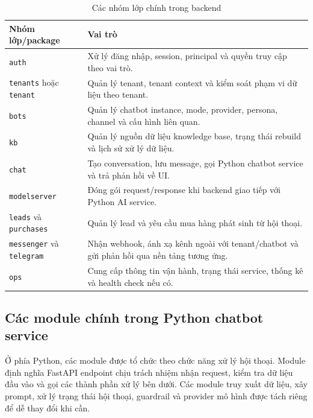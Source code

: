 \documentclass[../DoAn.tex]{subfiles}
\begin{document}
\begin{table}[H]
\centering
\caption{Các nhóm lớp chính trong backend}
\label{tab:ch4-backend-classes}
\begin{tabular}{|p{}|p{}|}
\hline
\textbf{Nhóm lớp/package} & \textbf{Vai trò} \\
\hline
\texttt{auth} & Xử lý đăng nhập, session, principal và quyền truy cập theo vai trò. \\
\hline
\texttt{tenants} hoặc \texttt{tenant} & Quản lý tenant, tenant context và kiểm soát phạm vi dữ liệu theo tenant. \\
\hline
\texttt{bots} & Quản lý chatbot instance, mode, provider, persona, channel và cấu hình liên quan. \\
\hline
\texttt{kb} & Quản lý nguồn dữ liệu knowledge base, trạng thái rebuild và lịch sử xử lý dữ liệu. \\
\hline
\texttt{chat} & Tạo conversation, lưu message, gọi Python chatbot service và trả phản hồi về UI. \\
\hline
\texttt{modelserver} & Đóng gói request/response khi backend giao tiếp với Python AI service. \\
\hline
\texttt{leads} và \texttt{purchases} & Quản lý lead và yêu cầu mua hàng phát sinh từ hội thoại. \\
\hline
\texttt{messenger} và \texttt{telegram} & Nhận webhook, ánh xạ kênh ngoài với tenant/chatbot và gửi phản hồi qua nền tảng tương ứng. \\
\hline
\texttt{ops} & Cung cấp thông tin vận hành, trạng thái service, thống kê và health check nếu có. \\
\hline
\end{tabular}
\end{table}

%

\subsection{Các module chính trong Python chatbot service}

Ở phía Python, các module được tổ chức theo chức năng xử lý hội thoại. Module định nghĩa FastAPI endpoint chịu trách nhiệm nhận request, kiểm tra dữ liệu đầu vào và gọi các thành phần xử lý bên dưới. Các module truy xuất dữ liệu, xây prompt, xử lý trạng thái hội thoại, guardrail và provider mô hình được tách riêng để dễ thay đổi khi cần.
\end{document}
